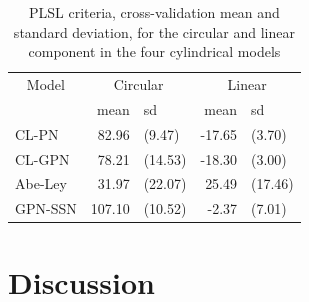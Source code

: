 \documentclass[man,mask]{apa6}
\begin{document}
\begin{table}

\caption{\label{tab:ModelFit}PLSL criteria, cross-validation mean and standard deviation, for the circular and linear component in the four cylindrical models}
\centering
\begin{tabular}[t]{lrlrl}
\toprule
\multicolumn{1}{c}{Model} & \multicolumn{2}{c}{Circular} & \multicolumn{2}{c}{Linear} \\
\cmidrule(l{2pt}r{2pt}){1-1} \cmidrule(l{2pt}r{2pt}){2-3} \cmidrule(l{2pt}r{2pt}){4-5}
  & mean & sd & mean & sd\\
\midrule
CL-PN & 82.96 & (9.47) & -17.65 & (3.70)\\
CL-GPN & 78.21 & (14.53) & -18.30 & (3.00)\\
Abe-Ley & 31.97 & (22.07) & 25.49 & (17.46)\\
GPN-SSN & 107.10 & (10.52) & -2.37 & (7.01)\\
\bottomrule
\end{tabular}
\end{table}

\section{Discussion}\label{Discussion}
\end{document}
